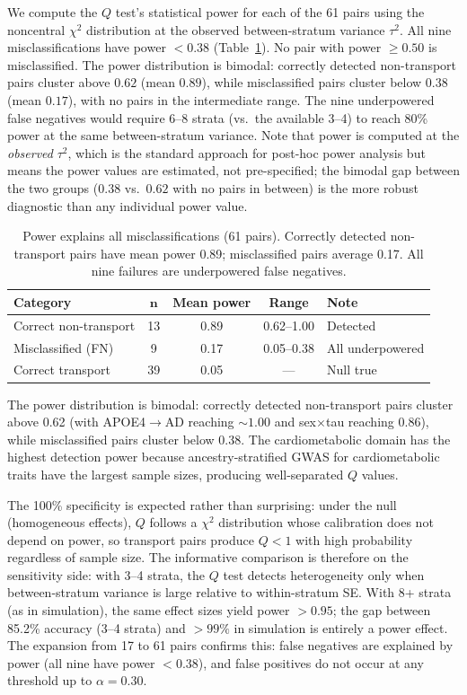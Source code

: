 \documentclass[11pt]{article}
\begin{document}
We compute the $Q$ test's statistical power for each of the 61 pairs using the noncentral $\chi^2$ distribution at the observed between-stratum variance $\tau^2$. All nine misclassifications have power $< 0.38$ (Table~\ref{tab:realdata-power}). No pair with power $\geq 0.50$ is misclassified. The power distribution is bimodal: correctly detected non-transport pairs cluster above $0.62$ (mean $0.89$), while misclassified pairs cluster below $0.38$ (mean $0.17$), with no pairs in the intermediate range. The nine underpowered false negatives would require 6--8 strata (vs.\ the available 3--4) to reach 80\% power at the same between-stratum variance. Note that power is computed at the \emph{observed} $\tau^2$, which is the standard approach for post-hoc power analysis but means the power values are estimated, not pre-specified; the bimodal gap between the two groups ($0.38$ vs.\ $0.62$ with no pairs in between) is the more robust diagnostic than any individual power value.

\begin{table}[t]
\centering
\caption{Power explains all misclassifications (61 pairs). Correctly detected non-transport pairs have mean power 0.89; misclassified pairs average 0.17. All nine failures are underpowered false negatives.}
\label{tab:realdata-power}
\small
\begin{tabular}{@{}lcccl@{}}
\toprule
\textbf{Category} & $\boldsymbol{n}$ & \textbf{Mean power} & \textbf{Range} & \textbf{Note} \\
\midrule
Correct non-transport & 13 & 0.89 & 0.62--1.00 & Detected \\
Misclassified (FN) & 9 & 0.17 & 0.05--0.38 & All underpowered \\
Correct transport & 39 & 0.05 & --- & Null true \\
\bottomrule
\end{tabular}
\end{table}

The power distribution is bimodal: correctly detected non-transport pairs cluster above 0.62 (with APOE4$\to$AD reaching ${\sim}1.00$ and sex$\times$tau reaching $0.86$), while misclassified pairs cluster below 0.38. The cardiometabolic domain has the highest detection power because ancestry-stratified GWAS for cardiometabolic traits have the largest sample sizes, producing well-separated $Q$ values.

The 100\% specificity is expected rather than surprising: under the null (homogeneous effects), $Q$ follows a $\chi^2$ distribution whose calibration does not depend on power, so transport pairs produce $Q < 1$ with high probability regardless of sample size.
The informative comparison is therefore on the sensitivity side: with 3--4 strata, the $Q$ test detects heterogeneity only when between-stratum variance is large relative to within-stratum SE.
With 8+ strata (as in simulation), the same effect sizes yield power $> 0.95$; the gap between 85.2\% accuracy (3--4 strata) and $> 99\%$ in simulation is entirely a power effect.
The expansion from 17 to 61 pairs confirms this: false negatives are explained by power (all nine have power $< 0.38$), and false positives do not occur at any threshold up to $\alpha = 0.30$.
\end{document}
